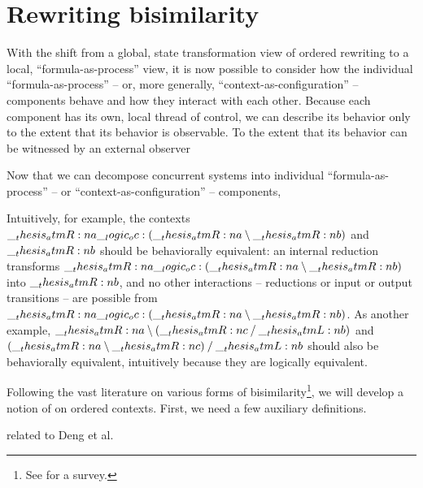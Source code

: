 \section{Rewriting bisimilarity}

With the shift from a global, state transformation view of ordered rewriting to a local, \enquote{formula-as-process} view, it is now possible to consider how the individual \enquote{formula-as-process} -- or, more generally, \enquote{context-as-configuration} -- components behave and how they interact with each other.
Because each component has its own, local thread of control, we can describe its behavior only to the extent that its behavior is observable.
To the extent that its behavior can be witnessed by an external observer

Now that we can decompose concurrent systems into individual \enquote{formula-as-process} -- or \enquote{context-as-configuration} -- components, 

Intuitively, for example, the contexts $\__thesis_atmR:n {a} \__logic_oc: (\__thesis_atmR:n {a} \mathbin { \setminus } \__thesis_atmR:n {b})$ and $\__thesis_atmR:n {b}$ should be behaviorally equivalent: an internal reduction transforms $\__thesis_atmR:n {a} \__logic_oc: (\__thesis_atmR:n {a} \mathbin { \setminus } \__thesis_atmR:n {b})$ into $\__thesis_atmR:n {b}$, and no other interactions -- reductions or input or output transitions -- are possible from $\__thesis_atmR:n {a} \__logic_oc: (\__thesis_atmR:n {a} \mathbin { \setminus } \__thesis_atmR:n {b})$.
As another example, $\__thesis_atmR:n {a} \mathbin { \setminus } (\__thesis_atmR:n {c} \mathbin { / } \__thesis_atmL:n {b})$ and $(\__thesis_atmR:n {a} \mathbin { \setminus } \__thesis_atmR:n {c}) \mathbin { / } \__thesis_atmL:n {b}$ should also be behaviorally equivalent, intuitively because they are logically equivalent.

Following the vast literature on various forms of bisimilarity\footnote{See \textcite{??} for a survey.}, we will develop a notion of  on ordered contexts.
First, we need a few auxiliary definitions.

related to Deng et al.




